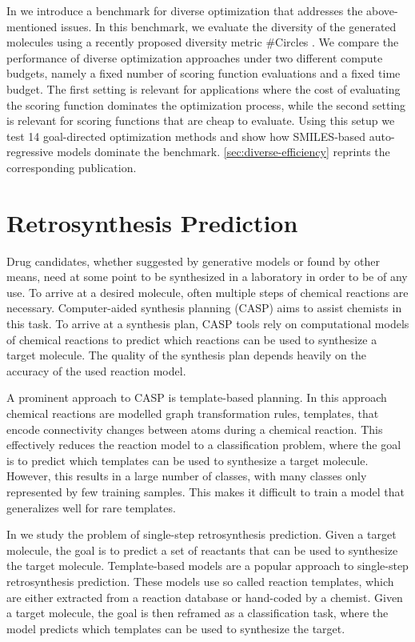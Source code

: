 In \citep{renzBenchmarkingEfficiencyGenerative2024} we introduce a benchmark 
for diverse optimization that addresses the above-mentioned issues. In this benchmark, we
evaluate the diversity of the generated molecules using a recently proposed diversity metric
\#Circles \citep{xie}. We compare the performance of diverse optimization approaches under two
different compute budgets, namely a fixed number of scoring function evaluations and a fixed time budget.
The first setting is relevant for applications where the cost of evaluating the scoring function 
dominates the optimization process, while the second setting is relevant for scoring functions that are
cheap to evaluate. 
Using this setup we test 14 goal-directed optimization methods and show how 
SMILES-based auto-regressive models dominate the benchmark. 
\autoref{sec:diverse-efficiency} reprints the corresponding publication.

\section{Retrosynthesis Prediction}
Drug candidates, whether suggested by generative models or found by other means,
need at some point to be synthesized in a laboratory in order to be of any use.
To arrive at a desired molecule, often multiple steps of chemical reactions are
necessary. Computer-aided synthesis planning (CASP) aims to assist chemists in
this task. To arrive at a synthesis plan, CASP tools rely on computational
models of chemical reactions to predict which reactions can be used to
synthesize a target molecule. The quality of the synthesis plan depends heavily
on the accuracy of the used reaction model.

A prominent approach to CASP is template-based planning. In this approach
chemical reactions are modelled graph transformation rules, templates, that
encode connectivity changes between atoms during a chemical reaction.
This effectively reduces the reaction model to a classification problem, where
the goal is to predict which templates can be used to synthesize a target molecule.
However, this results in a large number of classes, with many classes only
represented by few training samples. This makes it difficult to train a model
that generalizes well for rare templates.

In \citep{seidlImprovingFewZeroShot2022} we study the problem of single-step
retrosynthesis prediction. Given a target molecule, the goal is to predict a
set of reactants that can be used to synthesize the target molecule.
Template-based models are a popular approach to single-step retrosynthesis
prediction. These models use so called reaction templates, which are
either extracted from a reaction database or hand-coded by a chemist.
Given a target molecule, the goal is then reframed as a classification task,
where the model predicts which templates can be used to synthesize the target.

